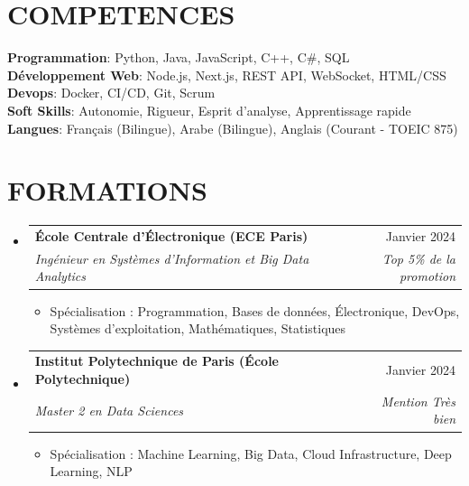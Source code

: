 \documentclass[11pt,a4paper]{article}
\makeatletter
\newcommand{\resumeItem}[1]{
  \item\footnotesize{
    {#1 \vspace{-1pt}}
  }
}
\newcommand{\resumeSubheading}[4]{
  \vspace{2pt}\item
    \begin{tabular*}{\textwidth}[t]{l@{\extracolsep{\fill}}r}
      {\footnotesize\textbf{#1}} & {\footnotesize#2} \\
      {\footnotesize\textit{#3}} & {\footnotesize\textit{#4}} \\
    \end{tabular*}\vspace{2pt}
}
\newcommand{\resumeSubHeadingListStart}{\begin{itemize}[leftmargin=0in, label={}]}
\newcommand{\resumeSubHeadingListEnd}{\end{itemize}}
\newcommand{\resumeItemListStart}{\begin{itemize}[label={\textbullet}]}
\newcommand{\resumeItemListEnd}{\end{itemize}\vspace{0pt}}
\makeatother
\begin{document}
\section{COMPETENCES}
\begin{itemize}[leftmargin=0in, label={}]
\footnotesize{\item{
{\footnotesize\textbf{Programmation}:} {\footnotesize Python, Java, JavaScript, C++, C{\#}, SQL} \\
\vspace{3pt}
{\footnotesize\textbf{Développement Web}:} {\footnotesize Node.js, Next.js, REST API, WebSocket, HTML/CSS} \\
\vspace{3pt}
{\footnotesize\textbf{Devops}:} {\footnotesize Docker, CI/CD, Git, Scrum} \\
\vspace{3pt}
{\footnotesize\textbf{Soft Skills}:} {\footnotesize Autonomie, Rigueur, Esprit d'analyse, Apprentissage rapide} \\
\vspace{3pt}
{\footnotesize\textbf{Langues}:} {\footnotesize Français (Bilingue), Arabe (Bilingue), Anglais (Courant - TOEIC 875)}
}
}
\end{itemize}

\section{FORMATIONS}
\resumeSubHeadingListStart
    \resumeSubheading
      {École Centrale d'Électronique (ECE Paris)}
      {Janvier 2024}
      {Ingénieur en Systèmes d'Information et Big Data Analytics}
      {Top 5\% de la promotion}
      \resumeItemListStart
        \resumeItem{Spécialisation : Programmation, Bases de données, Électronique, DevOps, Systèmes d'exploitation, Mathématiques, Statistiques}
      \resumeItemListEnd
    \resumeSubheading
      {Institut Polytechnique de Paris (École Polytechnique)}
      {Janvier 2024}
      {Master 2 en Data Sciences}
      {Mention Très bien}
      \resumeItemListStart
        \resumeItem{Spécialisation : Machine Learning, Big Data, Cloud Infrastructure, Deep Learning, NLP}
      \resumeItemListEnd
  \resumeSubHeadingListEnd
\end{document}
